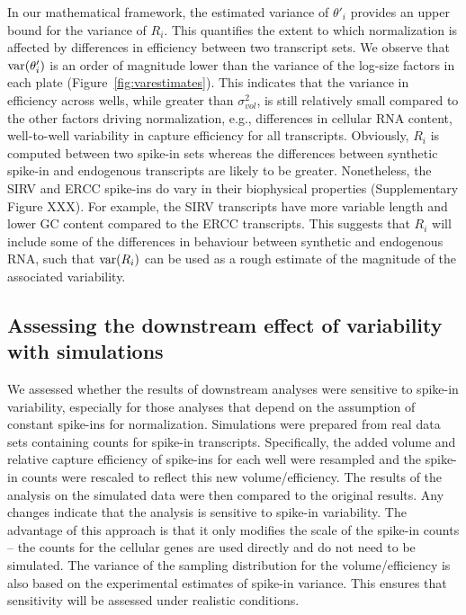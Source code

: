 \documentclass{article}
\begin{document}
In our mathematical framework, the estimated variance of $\theta'_i$ provides an upper bound for the variance of $R_i$.
This quantifies the extent to which normalization is affected by differences in efficiency between two transcript sets.
We observe that $\mbox{var}(\theta'_i)$ is an order of magnitude lower than the variance of the log-size factors in each plate (Figure~\ref{fig:varestimates}).
This indicates that the variance in efficiency across wells, while greater than $\sigma^2_{vol}$, is still relatively small compared to the other factors driving normalization, e.g., differences in cellular RNA content, well-to-well variability in capture efficiency for all transcripts.
Obviously, $R_i$ is computed between two spike-in sets whereas the differences between synthetic spike-in and endogenous transcripts are likely to be greater.
Nonetheless, the SIRV and ERCC spike-ins do vary in their biophysical properties (Supplementary Figure XXX).
For example, the SIRV transcripts have more variable length and lower GC content compared to the ERCC transcripts.
This suggests that $R_i$ will include some of the differences in behaviour between synthetic and endogenous RNA, such that $\mbox{var}(R_i)$ can be used as a rough estimate of the magnitude of the associated variability.

\subsection{Assessing the downstream effect of variability with simulations}
We assessed whether the results of downstream analyses were sensitive to spike-in variability, especially for those analyses that depend on the assumption of constant spike-ins for normalization.
Simulations were prepared from real data sets containing counts for spike-in transcripts.
Specifically, the added volume and relative capture efficiency of spike-ins for each well were resampled and the spike-in counts were rescaled to reflect this new volume/efficiency.
The results of the analysis on the simulated data were then compared to the original results.
Any changes indicate that the analysis is sensitive to spike-in variability.
The advantage of this approach is that it only modifies the scale of the spike-in counts -- the counts for the cellular genes are used directly and do not need to be simulated.
The variance of the sampling distribution for the volume/efficiency is also based on the experimental estimates of spike-in variance.
This ensures that sensitivity will be assessed under realistic conditions. 
\end{document}
